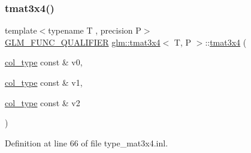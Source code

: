 \subsubsection{\texorpdfstring{tmat3x4()}{tmat3x4()}\hspace{0.1cm}{\footnotesize\ttfamily [7/22]}}
{\footnotesize\ttfamily template$<$typename T , precision P$>$ \\
\mbox{\hyperlink{setup_8hpp_a33fdea6f91c5f834105f7415e2a64407}{G\+L\+M\+\_\+\+F\+U\+N\+C\+\_\+\+Q\+U\+A\+L\+I\+F\+I\+ER}} \mbox{\hyperlink{structglm_1_1tmat3x4}{glm\+::tmat3x4}}$<$ T, P $>$\+::\mbox{\hyperlink{structglm_1_1tmat3x4}{tmat3x4}} (\begin{DoxyParamCaption}\item[{\mbox{\hyperlink{structglm_1_1tmat3x4_aa4c8d5353d59216a2f0566ce462fbc81}{col\+\_\+type}} const \&}]{v0,  }\item[{\mbox{\hyperlink{structglm_1_1tmat3x4_aa4c8d5353d59216a2f0566ce462fbc81}{col\+\_\+type}} const \&}]{v1,  }\item[{\mbox{\hyperlink{structglm_1_1tmat3x4_aa4c8d5353d59216a2f0566ce462fbc81}{col\+\_\+type}} const \&}]{v2 }\end{DoxyParamCaption})}



Definition at line 66 of file type\+\_\+mat3x4.\+inl.

\mbox{\label{structglm_1_1tmat3x4_aa797d8de2ec5784a9e29776f66998c9f}} 
